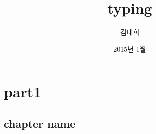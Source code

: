 \documentclass[12pt,a4paper,oneside]{book}
\begin{document}
	
			\dominitoc
			

			\title{typing}
			\author{김대희}
			\date{2015년 1월}
			\maketitle


			\tableofcontents
			\listoffigures
			\listoftables

			


\newpage
\part{part1}

\newpage
\chapter{chapter name}
\end{document}
